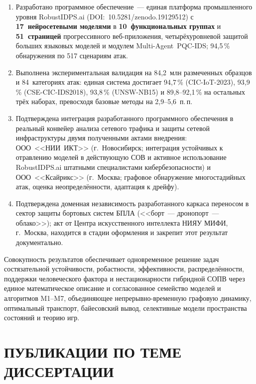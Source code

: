 \documentclass[12pt,a5paper]{article}
\begin{document}
\begin{enumerate}
\item Разработано программное обеспечение~--- единая
платформа промышленного уровня RobustIDPS.ai
(DOI:~10.5281/zenodo.19129512) с
\textbf{17~нейросетевыми моделями} в
\textbf{10~функциональных группах} и
\textbf{51~страницей} прогрессивного веб-приложения,
четырёхуровневой защитой больших языковых моделей и
модулем Multi-Agent~PQC-IDS; 94,5\,\% обнаружения по
517 сценариям атак.

\item Выполнена экспериментальная валидация на
84,2~млн размеченных образцов и 84~категориях атак:
единая система достигает 94,7\,\% (CIC-IoT-2023),
93,9\,\% (CSE-CIC-IDS2018), 93,8\,\% (UNSW-NB15) и
89,8--92,1\,\% на остальных трёх наборах, превосходя
базовые методы на 2,9--5,6~п.\,п.

\item Подтверждена интеграция разработанного программного
обеспечения в реальный конвейер анализа сетевого трафика
и защиты сетевой инфраструктуры двумя полученными актами
внедрения: ООО~<<НИИ~ИКТ>> (г.~Новосибирск; интеграция
устойчивых к отравлению моделей в действующую СОВ и
активное использование RobustIDPS.ai штатными
специалистами кибербезопасности) и ООО~<<Ксайрикс>>
(г.~Москва; графовое обнаружение многостадийных атак,
оценка неопределённости, адаптация к дрейфу).

\item Подтверждена доменная независимость разработанного
каркаса переносом в сектор защиты бортовых систем БПЛА
(<<борт~--- дронопорт~--- облако>>); акт от Центра
искусственного интеллекта НИЯУ МИФИ, г.~Москва, находится
в стадии оформления и закрепит этот результат
документально.
\end{enumerate}

Совокупность результатов обеспечивает одновременное решение
задач состязательной устойчивости, робастности,
эффективности, распределённости, поддержки человеческого
фактора и нестационарности гибридной СОПВ через единое
математическое описание и согласованное семейство моделей и
алгоритмов M1--M7, объединяющее непрерывно-временную
графовую динамику, оптимальный транспорт, байесовский
вывод, селективные модели пространства состояний и теорию
игр.

\vspace{1cm}

\section*{ПУБЛИКАЦИИ ПО ТЕМЕ ДИССЕРТАЦИИ}
\end{document}
